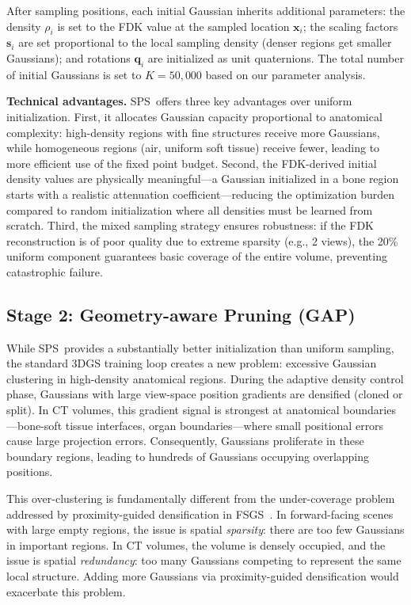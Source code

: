 \documentclass{egPublStyle}
\newcommand{\sps}{SPS}
\newcommand{\gap}{GAP}
\begin{document}
After sampling positions, each initial Gaussian inherits additional parameters: the density $\rho_i$ is set to the FDK value at the sampled location $\mathbf{x}_i$; the scaling factors $\mathbf{s}_i$ are set proportional to the local sampling density (denser regions get smaller Gaussians); and rotations $\mathbf{q}_i$ are initialized as unit quaternions. The total number of initial Gaussians is set to $K = 50{,}000$ based on our parameter analysis.

\textbf{Technical advantages.} \sps\ offers three key advantages over uniform initialization. First, it allocates Gaussian capacity proportional to anatomical complexity: high-density regions with fine structures receive more Gaussians, while homogeneous regions (air, uniform soft tissue) receive fewer, leading to more efficient use of the fixed point budget. Second, the FDK-derived initial density values are physically meaningful---a Gaussian initialized in a bone region starts with a realistic attenuation coefficient---reducing the optimization burden compared to random initialization where all densities must be learned from scratch. Third, the mixed sampling strategy ensures robustness: if the FDK reconstruction is of poor quality due to extreme sparsity (e.g., 2 views), the 20\% uniform component guarantees basic coverage of the entire volume, preventing catastrophic failure.

\subsection{Stage 2: Geometry-aware Pruning (\gap)}
\label{sec:gap}

While \sps\ provides a substantially better initialization than uniform sampling, the standard 3DGS training loop creates a new problem: excessive Gaussian clustering in high-density anatomical regions. During the adaptive density control phase, Gaussians with large view-space position gradients are densified (cloned or split). In CT volumes, this gradient signal is strongest at anatomical boundaries---bone-soft tissue interfaces, organ boundaries---where small positional errors cause large projection errors. Consequently, Gaussians proliferate in these boundary regions, leading to hundreds of Gaussians occupying overlapping positions.

This over-clustering is fundamentally different from the under-coverage problem addressed by proximity-guided densification in FSGS~\cite{zhu2024fsgs}. In forward-facing scenes with large empty regions, the issue is spatial \textit{sparsity}: there are too few Gaussians in important regions. In CT volumes, the volume is densely occupied, and the issue is spatial \textit{redundancy}: too many Gaussians competing to represent the same local structure. Adding more Gaussians via proximity-guided densification would exacerbate this problem.
\end{document}
